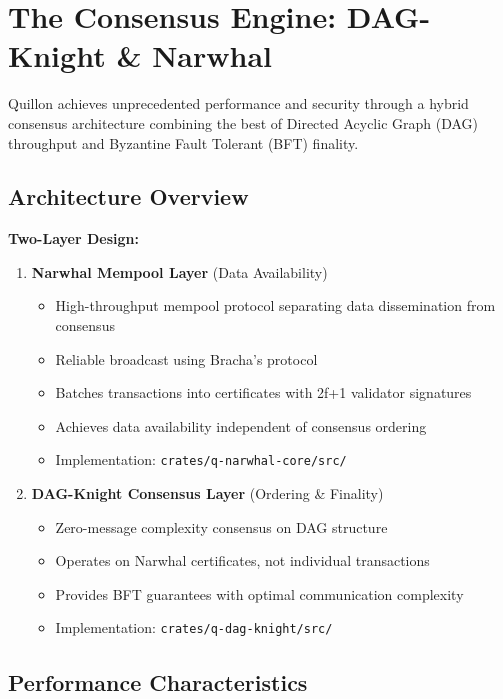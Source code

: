 \documentclass[11pt,a4paper]{scrartcl}
\begin{document}
\newpage

\section{The Consensus Engine: DAG-Knight \& Narwhal}

Quillon achieves unprecedented performance and security through a hybrid consensus architecture combining the best of Directed Acyclic Graph (DAG) throughput and Byzantine Fault Tolerant (BFT) finality.

\subsection{Architecture Overview}

\textbf{Two-Layer Design:}

\begin{enumerate}
\item \textbf{Narwhal Mempool Layer} (Data Availability)
   \begin{itemize}
   \item High-throughput mempool protocol separating data dissemination from consensus
   \item Reliable broadcast using Bracha's protocol
   \item Batches transactions into certificates with 2f+1 validator signatures
   \item Achieves data availability independent of consensus ordering
   \item Implementation: \texttt{crates/q-narwhal-core/src/}
   \end{itemize}

\item \textbf{DAG-Knight Consensus Layer} (Ordering \& Finality)
   \begin{itemize}
   \item Zero-message complexity consensus on DAG structure
   \item Operates on Narwhal certificates, not individual transactions
   \item Provides BFT guarantees with optimal communication complexity
   \item Implementation: \texttt{crates/q-dag-knight/src/}
   \end{itemize}
\end{enumerate}

\subsection{Performance Characteristics}
\end{document}
